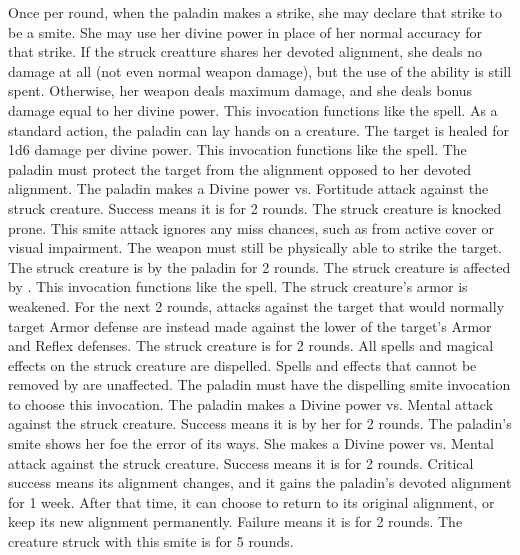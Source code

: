         Once per round, when the paladin makes a strike, she may declare that strike to be a smite.
        She may use her divine power in place of her normal accuracy for that strike.
        If the struck creatture shares her devoted alignment, she deals no damage at all (not even normal weapon damage), but the use of the ability is still spent.
        Otherwise, her weapon deals maximum damage, and she deals bonus damage equal to her divine power.
         This invocation functions like the  spell.
        As a standard action, the paladin can lay hands on a creature.
        The target is healed for 1d6 damage per divine power.
         This invocation functions like the  spell.
        The paladin must protect the target from the alignment opposed to her devoted alignment.
        The paladin makes a Divine power vs. Fortitude attack against the struck creature.
        Success means it is \exhausted for 2 rounds.
        The struck creature is knocked prone.
        This smite attack ignores any miss chances, such as from active cover or visual impairment.
        The weapon must still be physically able to strike the target.
        The struck creature is \goaded by the paladin for 2 rounds.
        The struck creature is affected by .
        This invocation functions like the  spell.
        The struck creature's armor is weakened.
        For the next 2 rounds, attacks against the target that would normally target Armor defense are instead made against the lower of the target's Armor and Reflex defenses.
        The struck creature is \dazed for 2 rounds.
        All spells and magical effects on the struck creature are dispelled.
        Spells and effects that cannot be removed by  are unaffected.
        The paladin must have the dispelling smite invocation to choose this invocation.
        The paladin makes a Divine power vs. Mental attack against the struck creature.
        Success means it is \frightened by her for 2 rounds.
        The paladin's smite shows her foe the error of its ways.
        She makes a Divine power vs. Mental attack against the struck creature.
        Success means it is \confused for 2 rounds.
        Critical success means its alignment changes, and it gains the paladin's devoted alignment for 1 week.
        After that time, it can choose to return to its original alignment, or keep its new alignment permanently.
        Failure means it is \dazed for 2 rounds.
        The creature struck with this smite is \immobilized for 5 rounds.

